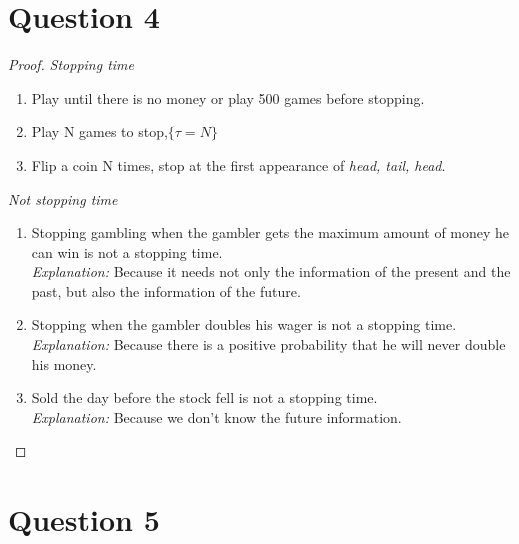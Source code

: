\documentclass{article}
\begin{document}
\section*{Question 4}
    \begin{proof}
        \indent
        \textit{Stopping time}
        \begin{enumerate}
            \item Play until there is no money or play 500 games before stopping.
            \item Play N games to stop,$\{\tau=N\}$
            \item Flip a coin N times, stop at the first appearance of \textit{head, tail, head}.
        \end{enumerate}
        \textit{Not stopping time}
        \begin{enumerate}
            \item Stopping gambling when the gambler gets the maximum amount of money he can win is not a stopping time.\\
            \textit{Explanation:} Because it needs not only the information of the present and the past, but also the information of the future.
            \item Stopping when the gambler doubles his wager is not a stopping time.\\
            \textit{Explanation:} Because there is a positive probability that he will never double his money.
            \item Sold the day before the stock fell is not a stopping time.\\
            \textit{Explanation:} Because we don’t know the future information.
        \end{enumerate}
    \end{proof}

\section*{Question 5}
    
\end{document}

